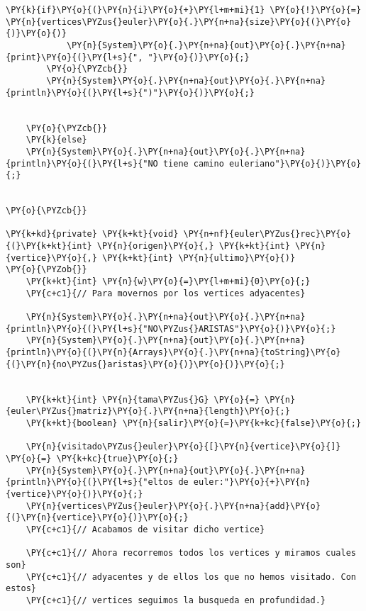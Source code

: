 \begin{Verbatim}[commandchars=\\\{\}]
		    \PY{k}{if}\PY{o}{(}\PY{n}{i}\PY{o}{+}\PY{l+m+mi}{1} \PY{o}{!}\PY{o}{=} \PY{n}{vertices\PYZus{}euler}\PY{o}{.}\PY{n+na}{size}\PY{o}{(}\PY{o}{)}\PY{o}{)}
			\PY{n}{System}\PY{o}{.}\PY{n+na}{out}\PY{o}{.}\PY{n+na}{print}\PY{o}{(}\PY{l+s}{", "}\PY{o}{)}\PY{o}{;}
		\PY{o}{\PYZcb{}}
	    \PY{n}{System}\PY{o}{.}\PY{n+na}{out}\PY{o}{.}\PY{n+na}{println}\PY{o}{(}\PY{l+s}{")"}\PY{o}{)}\PY{o}{;}
			
	
	\PY{o}{\PYZcb{}}
    \PY{k}{else}
	\PY{n}{System}\PY{o}{.}\PY{n+na}{out}\PY{o}{.}\PY{n+na}{println}\PY{o}{(}\PY{l+s}{"NO tiene camino euleriano"}\PY{o}{)}\PY{o}{;}

	
\PY{o}{\PYZcb{}}

\PY{k+kd}{private} \PY{k+kt}{void} \PY{n+nf}{euler\PYZus{}rec}\PY{o}{(}\PY{k+kt}{int} \PY{n}{origen}\PY{o}{,} \PY{k+kt}{int} \PY{n}{vertice}\PY{o}{,} \PY{k+kt}{int} \PY{n}{ultimo}\PY{o}{)}
\PY{o}{\PYZob{}}
    \PY{k+kt}{int} \PY{n}{w}\PY{o}{=}\PY{l+m+mi}{0}\PY{o}{;}
    \PY{c+c1}{// Para movernos por los vertices adyacentes}

    \PY{n}{System}\PY{o}{.}\PY{n+na}{out}\PY{o}{.}\PY{n+na}{println}\PY{o}{(}\PY{l+s}{"NO\PYZus{}ARISTAS"}\PY{o}{)}\PY{o}{;}
    \PY{n}{System}\PY{o}{.}\PY{n+na}{out}\PY{o}{.}\PY{n+na}{println}\PY{o}{(}\PY{n}{Arrays}\PY{o}{.}\PY{n+na}{toString}\PY{o}{(}\PY{n}{no\PYZus{}aristas}\PY{o}{)}\PY{o}{)}\PY{o}{;}
	

    \PY{k+kt}{int} \PY{n}{tama\PYZus{}G} \PY{o}{=} \PY{n}{euler\PYZus{}matriz}\PY{o}{.}\PY{n+na}{length}\PY{o}{;}
    \PY{k+kt}{boolean} \PY{n}{salir}\PY{o}{=}\PY{k+kc}{false}\PY{o}{;}

    \PY{n}{visitado\PYZus{}euler}\PY{o}{[}\PY{n}{vertice}\PY{o}{]} \PY{o}{=} \PY{k+kc}{true}\PY{o}{;}
    \PY{n}{System}\PY{o}{.}\PY{n+na}{out}\PY{o}{.}\PY{n+na}{println}\PY{o}{(}\PY{l+s}{"eltos de euler:"}\PY{o}{+}\PY{n}{vertice}\PY{o}{)}\PY{o}{;}
    \PY{n}{vertices\PYZus{}euler}\PY{o}{.}\PY{n+na}{add}\PY{o}{(}\PY{n}{vertice}\PY{o}{)}\PY{o}{;}
    \PY{c+c1}{// Acabamos de visitar dicho vertice}
	
    \PY{c+c1}{// Ahora recorremos todos los vertices y miramos cuales son}
    \PY{c+c1}{// adyacentes y de ellos los que no hemos visitado. Con estos}
    \PY{c+c1}{// vertices seguimos la busqueda en profundidad.}


\end{Verbatim}
